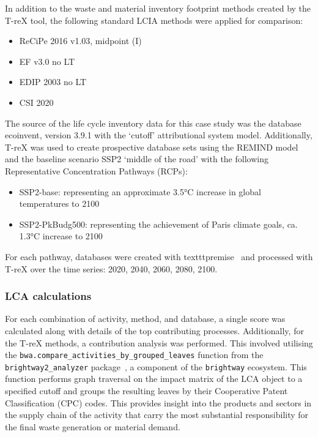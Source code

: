 In addition to the waste and material inventory footprint methods created by the T-reX tool, the following standard LCIA methods were applied for comparison:

\begin{itemize}[itemsep=0pt]
    \item ReCiPe 2016 v1.03, midpoint (I)
    \item EF v3.0 no LT
    \item EDIP 2003 no LT
    \item CSI 2020
\end{itemize}

The source of the life cycle inventory data for this case study was the database ecoinvent, version 3.9.1 with the `cutoff' attributional system model. Additionally, T-reX was used to create prospective database sets using the \mbox{REMIND} model and the baseline scenario SSP2 `middle of the road' with the following Representative Concentration Pathways (RCPs):
\begin{itemize}
    \item SSP2-base: representing an approximate 3.5°C increase in global temperatures to 2100
    \item SSP2-PkBudg500: representing the achievement of Paris climate goals, ca. 1.3°C increase to 2100
\end{itemize}

For each pathway, databases were created with texttt{premise}~\citep{sacchi2022premise} and processed with T-reX over the time series: 2020, 2040, 2060, 2080, 2100.

\subsubsection{LCA calculations}
For each combination of activity, method, and database, a single score was calculated along with details of the top contributing processes. Additionally, for the T-reX methods, a contribution analysis was performed. This involved utilising the \texttt{bwa.compare\_activities\_by\_grouped\_leaves} function from the \texttt{brightway2\_analyzer} package~\citep{mutel2016brightway2analyzer}, a component of the \texttt{brightway} ecosystem. This function performs graph traversal on the impact matrix of the LCA object to a specified cutoff and groups the resulting leaves by their Cooperative Patent Classification (CPC) codes. This provides insight into the products and sectors in the supply chain of the activity that carry the most substantial responsibility for the final waste generation or material demand.


